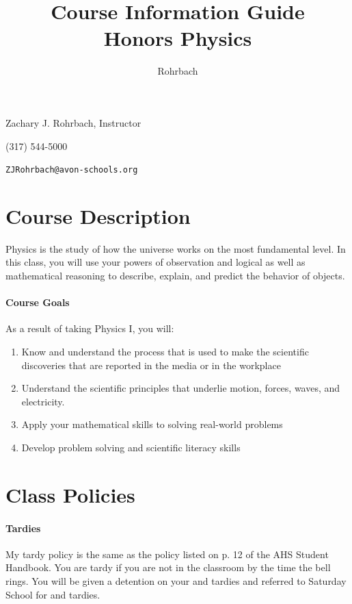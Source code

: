 \documentclass[10pt]{exam}
\title{Course Information Guide \\ Honors Physics}
\author{Rohrbach}
\begin{document}
\maketitle

\noindent Zachary J. Rohrbach, Instructor

\noindent (317) 544-5000

\noindent \texttt{ZJRohrbach@avon-schools.org}

\section*{Course Description}

Physics is the study of how the universe works on the most fundamental level.  In this 
class, you will use your powers of observation and logical as well as mathematical 
reasoning to describe, explain, and predict the behavior of objects.

\paragraph{Course Goals} 
As a result of taking Physics I, you will:

\begin{enumerate}
	\item Know and understand the process that is used to make the scientific discoveries that 
				are reported in the media or in the workplace
	\item Understand the scientific principles that underlie motion, forces, waves, and electricity.
	\item Apply your mathematical skills to solving real-world problems
	\item Develop problem solving and scientific literacy skills
\end{enumerate}

\section*{Class Policies}

	\paragraph{Tardies}
		My tardy policy is the same as the policy listed on p. 12  of the AHS Student Handbook.  You are tardy if you are not in the classroom by the time the bell rings.  You will be given a detention on your  and  tardies and referred to Saturday School for  and  tardies.
	
\end{document}
